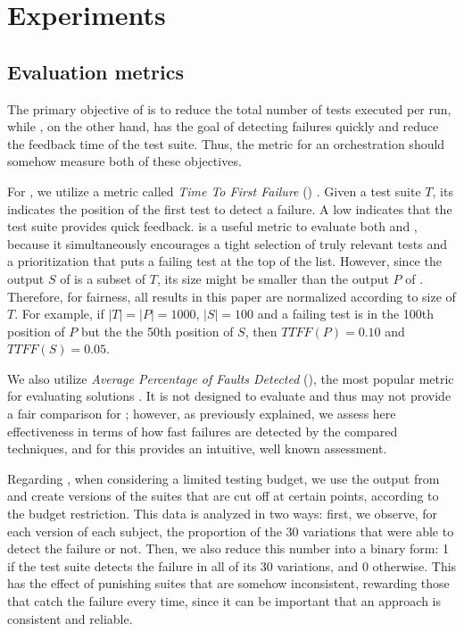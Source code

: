 \section{Experiments}\label{sec:orch_experiments}

\subsection{Evaluation metrics}
\label{subsec:metrics}

The primary objective of \tcs is to reduce the total number of tests executed per run, while \tcp, on the other hand, 
has the goal of detecting failures quickly and reduce the feedback time of the test suite.
Thus, the metric for an orchestration should somehow measure both of these objectives.

For , we utilize a metric called \textit{Time To First Failure} (\ttff) \cite{yoo2011faster}.
Given a test suite $T$, its \ttff indicates the position of the first test to detect a failure.
A low \ttff indicates that the test suite provides quick feedback.
\ttff is a useful metric to evaluate both \tcs and \tcp, because it simultaneously encourages a tight selection of truly relevant tests and a prioritization that puts a failing test at the top of the list.
However, since the output $S$ of \tcs is a subset of $T$, its size might be smaller than the output $P$ of \tcp.
Therefore, for fairness, all \ttff results in this paper are normalized according to size of $T$.
For example, if $|T| = |P| = 1000$, $|S| = 100$ and a failing test is in the 100th position of $P$ but the the 50th position of $S$, then $TTFF(P) = 0.10$ and $TTFF(S) = 0.05$.

We also utilize \textit{Average Percentage of Faults Detected} (\apfd), the most popular metric for evaluating \tcp solutions \cite{khatibsyarbini_test_2018}.
It is not designed to evaluate \tcs and thus may not provide a fair comparison for \ek; however, as previously explained, we assess here effectiveness in terms of how fast failures are detected by the compared techniques, and for this \apfd provides an intuitive, well known assessment.  

Regarding , when considering a limited testing budget, we use the output from  and create versions of the suites that are cut off at certain points, according to the budget restriction.
This data is analyzed in two ways: first, we observe, for each version of each subject, the proportion of the 30 variations that were able to detect the failure or not.
Then, we also reduce this number into a binary form: 1 if the test suite detects the failure in all of its 30 variations, and 0 otherwise.
This has the effect of punishing suites that are somehow inconsistent, rewarding those that catch the failure every time, 
since it can be
important that an approach is consistent and reliable.

